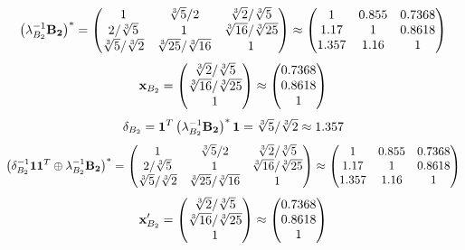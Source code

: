 \documentclass[10pt,a4paper]{article}
\begin{document}
	\[
		\left(\lambda_{B_2}^{-1}\bold{B_2}\right)^* = 
		\begin{pmatrix}
			{1}{} & {\sqrt[3]{5}} / {{2}} & {\sqrt[3]{2}} / {\sqrt[3]{5}} \\
			{{2}} / {\sqrt[3]{5}} & {1}{} & {\sqrt[3]{16}} / {\sqrt[3]{25}} \\
			{\sqrt[3]{5}} / {\sqrt[3]{2}} & {\sqrt[3]{25}} / {\sqrt[3]{16}} & {1}{} \\
		\end{pmatrix}
		\approx
		\begin{pmatrix}
			1        & 0.855    & 0.7368   \\
			1.17     & 1        & 0.8618   \\
			1.357    & 1.16     & 1        \\
		\end{pmatrix}
	\]
	\[
		\bold{x}_{B_2} = 
		\begin{pmatrix}
			{\sqrt[3]{2}} / {\sqrt[3]{5}} \\
			{\sqrt[3]{16}} / {\sqrt[3]{25}} \\
			{1}{} \\
		\end{pmatrix}
		\approx
		\begin{pmatrix}
			0.7368   \\
			0.8618   \\
			1        \\
		\end{pmatrix}
	\]
	\[
		\delta_{B_2} = \bold{1}^T \left(\lambda_{B_2}^{-1}\bold{B_2}\right)^* \bold{1} = {\sqrt[3]{5}} / {\sqrt[3]{2}}\approx 1.357
	\]
	\[
		\left(\delta_{B_2}^{-1}\bold{11}^T \oplus \lambda_{B_2}^{-1}\bold{B_2}\right)^* = 
		\begin{pmatrix}
			{1}{} & {\sqrt[3]{5}} / {{2}} & {\sqrt[3]{2}} / {\sqrt[3]{5}} \\
			{{2}} / {\sqrt[3]{5}} & {1}{} & {\sqrt[3]{16}} / {\sqrt[3]{25}} \\
			{\sqrt[3]{5}} / {\sqrt[3]{2}} & {\sqrt[3]{25}} / {\sqrt[3]{16}} & {1}{} \\
		\end{pmatrix}
		\approx
		\begin{pmatrix}
			1        & 0.855    & 0.7368   \\
			1.17     & 1        & 0.8618   \\
			1.357    & 1.16     & 1        \\
		\end{pmatrix}
	\]
	\[
		\bold{x}'_{B_2} = 
		\begin{pmatrix}
			{\sqrt[3]{2}} / {\sqrt[3]{5}} \\
			{\sqrt[3]{16}} / {\sqrt[3]{25}} \\
			{1}{} \\
		\end{pmatrix}
		\approx
		\begin{pmatrix}
			0.7368   \\
			0.8618   \\
			1        \\
		\end{pmatrix}
	\]
\end{document}

